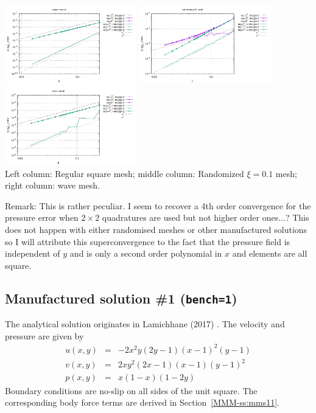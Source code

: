 \begin{center}
\includegraphics[width=5.7cm]{python_codes/fieldstone_76/results/bench3/reg/errors_P}
\includegraphics[width=5.7cm]{python_codes/fieldstone_76/results/bench3/rand/errors_P}
\includegraphics[width=5.7cm]{python_codes/fieldstone_76/results/bench3/wave/errors_P}\\
{\captionfont Left column: Regular square mesh; middle column: Randomized $\xi=0.1$ mesh;
right column: wave mesh.}
\end{center}

Remark: This is rather peculiar. I seem to recover 
a 4th order convergence for the pressure error when 
$2\times 2$ quadratures are used but not higher order ones...? 
This does not happen with either randomised meshes or 
other manufactured solutions so I will attribute this superconvergence 
to the fact that the pressure field is independent 
of $y$ and is only a second order polynomial in $x$ and elements are all square. 

\newpage
\subsection*{Manufactured solution \#1 ({\tt bench=1})}

The analytical solution originates in Lamichhane (2017) \cite{lami17}.
The velocity and pressure are given by
\begin{eqnarray}
u(x,y)&=&-2x^2y(2y-1)(x-1)^2(y-1) \\
v(x,y)&=& 2xy^2(2x-1)(x-1)(y-1)^2 \\
p(x,y)&=& x(1-x)(1-2y)
\end{eqnarray}
Boundary conditions are no-slip on all sides of the unit square. 
The corresponding body force terms are derived in Section~\ref{MMM-ss:mms11}. 

